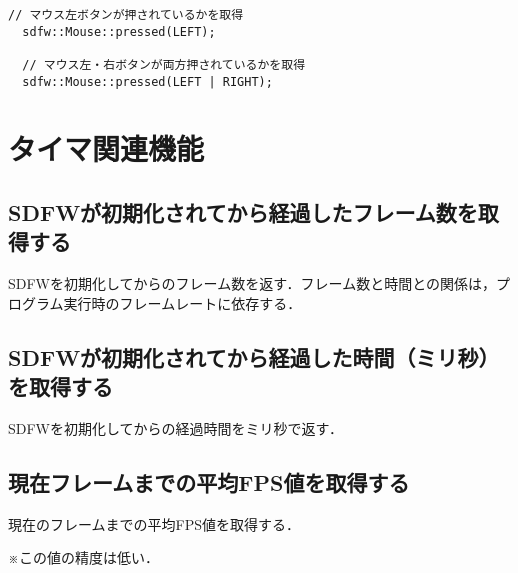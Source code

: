 \documentclass[a4paper, 11pt, oneside, onecolumn, openany]{jsarticle}
\begin{document}
\begin{lstlisting}[caption=使用例, label=macro-GetMouseButtonState, keepspaces=true]
  // マウス左ボタンが押されているかを取得
  sdfw::Mouse::pressed(LEFT);

  // マウス左・右ボタンが両方押されているかを取得
  sdfw::Mouse::pressed(LEFT | RIGHT);
\end{lstlisting}


\section{タイマ関連機能}
\subsection{SDFWが初期化されてから経過したフレーム数を取得する}
SDFWを初期化してからのフレーム数を返す．フレーム数と時間との関係は，プログラム実行時のフレームレートに依存する．

\subsection{SDFWが初期化されてから経過した時間（ミリ秒）を取得する}
SDFWを初期化してからの経過時間をミリ秒で返す．

\subsection{現在フレームまでの平均FPS値を取得する}
現在のフレームまでの平均FPS値を取得する．\par
※この値の精度は低い．
\end{document}
